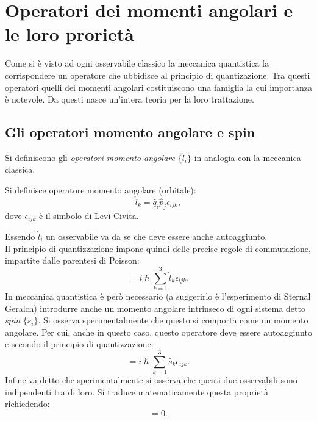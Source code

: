 \section{Operatori dei momenti angolari e le loro prorietà}
Come si è visto ad ogni osservabile classico la meccanica quantistica fa corrispondere un operatore che ubbidisce al principio di quantizazione. Tra questi operatori quelli dei momenti angolari costituiscono una famiglia la cui importanza è notevole. Da questi nasce un'intera teoria per la loro trattazione.
\subsection{Gli operatori momento angolare e spin}
Si definiscono gli \emph{operatori momento angolare} $\{\hat l_i\}$ in analogia con la meccanica classica.
\begin{definition}
    Si definisce operatore momento angolare (orbitale):
    \begin{equation*}
        \hat l_k=\hat q_i \hat p_j \epsilon_{ijk},
    \end{equation*}
    dove $\epsilon_{ijk}$ è il simbolo di Levi-Civita.
\end{definition}
Essendo $\hat l_i$ un osservabile va da se che deve essere anche autoaggiunto.\\
Il principio di quantizzazione impone quindi delle precise regole di commutazione, impartite dalle parentesi di Poisson:
\begin{equation*}
    [\hat l_i,\hat l_j]=i\hslash \sum_{k=1}^3\hat l_k\epsilon_{ijk}.
\end{equation*}
In meccanica quantistica è però necessario (a suggerirlo è l'esperimento di Sternal Geralch) introdurre anche un momento angolare intrinseco di ogni sistema detto \emph{spin} $\{\hat s_i\}$. Si osserva sperimentalmente che questo si comporta come un momento angolare. Per cui, anche in questo caso, questo operatore deve essere autoaggiunto e secondo il principio di quantizzazione:
\begin{equation*}
    [\hat s_i,\hat s_j]=i\hslash \sum_{k=1}^3\hat s_k\epsilon_{ijk}.
\end{equation*}
Infine va detto che sperimentalmente si osserva che questi due osservabili sono indipendenti tra di loro. Si traduce matematicamente questa proprietà richiedendo:
\begin{equation*}
    [\hat l_i,\hat s_j]=0.
\end{equation*} 

